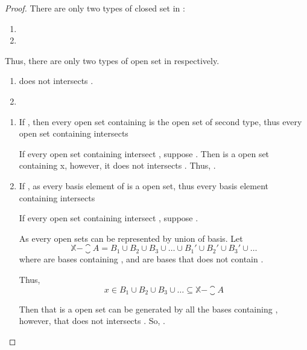 \begin{proof}
      There are only two types of closed set  in :
      \begin{enumerate}
            \item {}
            \item {}
      \end{enumerate}

      Thus, there are only two types of open set  in  respectively.
      \begin{enumerate}
            \item {} does not intersects .
            \item {} 
      \end{enumerate}

      \begin{enumerate}
            \item If , then every open set containing  is the open set of second type, thus every open set containing  intersects 
            
            If every open set containing  intersect , suppose . Then  is a open set containing x, however, it does not intersects . Thus, .

            \item If , as every basis element of  is a open set, thus every basis element containing  intersects 
            
            If every open set containing  intersect , suppose .

            As every open sets can be represented by union of basis. Let 
            \begin{equation*}
                  \mathbb{X} - \closure{A} = B_{1} \cup B_{2} \cup B_{3} \cup \dots \cup B_{1}' \cup B_{2}' \cup B_{3}' \cup \dots 
            \end{equation*}
            where  are bases containing , and  are bases that does not contain .

            Thus, 
            \begin{equation*}
                  x \in B_{1} \cup B_{2} \cup B_{3} \cup \dots \subseteq \mathbb{X} - \closure{A}
            \end{equation*}

            Then  that is a open set can be generated by all the bases containing , however, that does not intersects . So, .
      \end{enumerate}
\end{proof}

